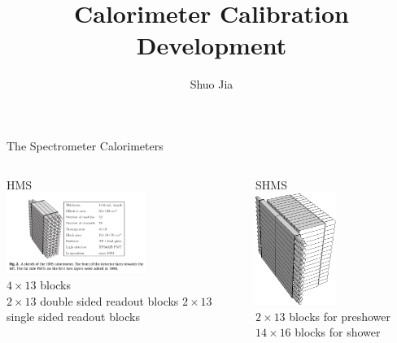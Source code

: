 \documentclass[aspectratio=169,xcolor=dvipsnames]{beamer}
\title{Calorimeter Calibration Development}
\date{}
\author{Shuo Jia}
\begin{document}
\maketitle


\begin{frame}{The Spectrometer Calorimeters}
  \begin{columns}
    \begin{column}{0.4\textwidth}
      {
        \centering
        HMS\\
        \includegraphics[width=0.6\textwidth,trim=5mm 4cm 24.5cm 5mm,clip]{HMS_calorimeter.png}\\
      }
      $4\times13$ blocks\\
      $2\times13$  double sided readout blocks
      $2\times13$  single sided readout blocks
    \end{column}
    \begin{column}{0.4\textwidth}
      {
        \centering
        SHMS\\
        \includegraphics[width=0.5\textwidth]{shms_calo_sk.eps}\\
      }
    $2\times13$ blocks for preshower \\
    $14\times16$ blocks for shower
    \end{column}
  \end{columns}
\end{frame}
\end{document}
